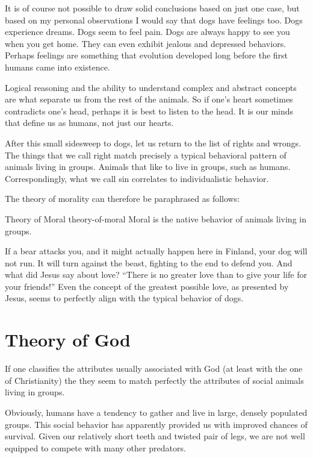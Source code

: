 It is of course not possible to draw solid conclusions based on
just one case, but based on my personal observations I would say
that dogs have feelings too. Dogs experience dreams. Dogs seem to
feel pain. Dogs are always happy to see you when you get home. They
can even exhibit jealous and depressed behaviors. Perhaps feelings
are something that evolution developed long before the first humans
came into existence.

Logical reasoning and the ability to understand complex and
abstract concepts are what separate us from the rest of the
animals. So if one's heart sometimes contradicts one's head,
perhaps it is best to listen to the head. It is our minds that
define us as humans, not just our hearts.

After this small sidesweep to dogs, let us return to the list of
rights and wrongs. The things that we call right match precisely a
typical behavioral pattern of animals living in groups. Animals
that like to live in groups, such as humans. Correspondingly, what
we call sin correlates to individualistic behavior.

The theory of morality can therefore be paraphrased as follows:

\begin{principle}{Theory of Moral}
{theory-of-moral}
Moral is the native behavior of animals living in groups.
\end{principle}

If a bear attacks you, and it might actually happen here in
Finland, your dog will not run. It will turn against the beast,
fighting to the end to defend you. And what did Jesus say about
love? ``There is no greater love than to give your life for your
friends!'' Even the concept of the greatest possible love, as
presented by Jesus, seems to perfectly align with the typical
behavior of dogs.

\section{Theory of God}

If one classifies the attributes usually associated with God (at least with
the one of Christianity) the they seem to match perfectly the attributes
of social animals living in groups.

Obviously, humans have a tendency to gather and live in large, densely
populated groups. This social behavior has apparently provided us
with improved chances of survival. Given our relatively short
teeth and twisted pair of legs, we are not well equipped to compete
with many other predators.

